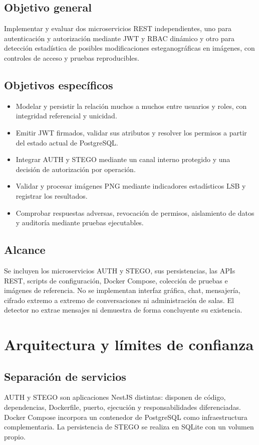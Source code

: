\documentclass[11pt,a4paper,oneside]{article}
\begin{document}
\subsection{Objetivo general}
Implementar y evaluar dos microservicios REST independientes, uno para autenticación y autorización mediante JWT y RBAC dinámico y otro para detección estadística de posibles modificaciones esteganográficas en imágenes, con controles de acceso y pruebas reproducibles.

\subsection{Objetivos específicos}
\begin{itemize}
\item Modelar y persistir la relación muchos a muchos entre usuarios y roles, con integridad referencial y unicidad.
\item Emitir JWT firmados, validar sus atributos y resolver los permisos a partir del estado actual de PostgreSQL.
\item Integrar AUTH y STEGO mediante un canal interno protegido y una decisión de autorización por operación.
\item Validar y procesar imágenes PNG mediante indicadores estadísticos LSB y registrar los resultados.
\item Comprobar respuestas adversas, revocación de permisos, aislamiento de datos y auditoría mediante pruebas ejecutables.
\end{itemize}

\subsection{Alcance}
Se incluyen los microservicios AUTH y STEGO, sus persistencias, las APIs REST, scripts de configuración, Docker Compose, colección de pruebas e imágenes de referencia. No se implementan interfaz gráfica, chat, mensajería, cifrado extremo a extremo de conversaciones ni administración de salas. El detector no extrae mensajes ni demuestra de forma concluyente su existencia.

\section{Arquitectura y límites de confianza}
\subsection{Separación de servicios}
AUTH y STEGO son aplicaciones NestJS distintas: disponen de código, dependencias, Dockerfile, puerto, ejecución y responsabilidades diferenciadas. Docker Compose incorpora un contenedor de PostgreSQL como infraestructura complementaria. La persistencia de STEGO se realiza en SQLite con un volumen propio.
\end{document}
